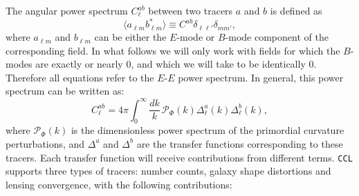 \documentclass[\docopts]{\docclass}
\newcommand{\ccl}{{\tt CCL}\xspace}
\begin{document}
The angular power spectrum $C^{ab}_\ell$ between two tracers $a$ and $b$ is defined as
\begin{equation}
  \langle a_{\ell m}b^*_{\ell m}\rangle\equiv C^{ab}\delta_{\ell\ell'}\delta_{mm'},
  \label{eq:clgen}
\end{equation}
where $a_{\ell m}$ and $b_{\ell m}$ can be either the $E$-mode or $B$-mode component of the corresponding field. In what follows we will only work with fields for which the $B$-modes are exactly or nearly $0$, and which we will take to be identically $0$. Therefore all equations refer to the $E$-$E$ power spectrum. In general, this power spectrum can be written as:
\begin{equation}
  C^{ab}_\ell=4\pi\int_0^\infty \frac{dk}{k}\,\mathcal{P}_\Phi(k)\Delta^a_\ell(k)\Delta^b_\ell(k),
  \label{eq:cls}
\end{equation}
where $\mathcal{P}_\Phi(k)$ is the dimensionless power spectrum of the primordial curvature perturbations, and $\Delta^a$ and $\Delta^b$ are the transfer functions corresponding to these tracers. Each transfer function will receive contributions from different terms. \ccl supports three types of tracers: number counts, galaxy shape distortions and lensing convergence, with the following contributions:
\end{document}
